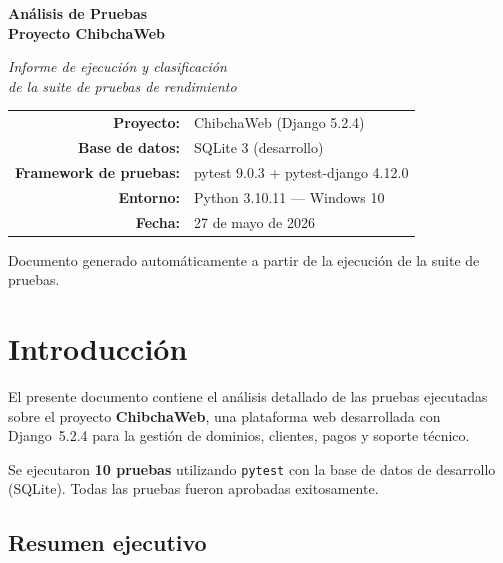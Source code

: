 \documentclass[12pt,a4paper]{article}
\begin{document}
\begin{titlepage}
\centering
\vspace*{3cm}
{\Huge\bfseries Análisis de Pruebas\\[0.4em]
Proyecto ChibchaWeb\par}
\vspace{1.5cm}
{\Large\itshape Informe de ejecución y clasificación\\de la suite de pruebas de rendimiento\par}
\vspace{2cm}
{\large
\begin{tabular}{rl}
\textbf{Proyecto:}   & ChibchaWeb (Django 5.2.4) \\
\textbf{Base de datos:} & SQLite 3 (desarrollo) \\
\textbf{Framework de pruebas:} & pytest 9.0.3 + pytest-django 4.12.0 \\
\textbf{Entorno:}    & Python 3.10.11 — Windows 10 \\
\textbf{Fecha:}      & 27 de mayo de 2026 \\
\end{tabular}\par}
\vfill
{\small Documento generado automáticamente a partir de la ejecución de la suite de pruebas.}
\end{titlepage}

\tableofcontents
\newpage

\section{Introducción}

El presente documento contiene el análisis detallado de las pruebas ejecutadas sobre el
proyecto \textbf{ChibchaWeb}, una plataforma web desarrollada con Django~5.2.4 para la
gestión de dominios, clientes, pagos y soporte técnico.

Se ejecutaron \textbf{10 pruebas} utilizando \texttt{pytest} con la base de datos de
desarrollo (SQLite). Todas las pruebas fueron aprobadas exitosamente.

\subsection{Resumen ejecutivo}
\end{document}
